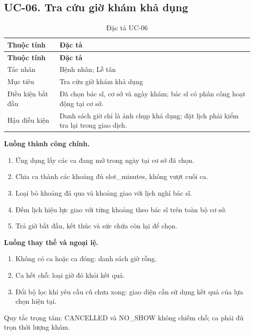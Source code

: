\clearpage

\subsection{UC-06.\allowbreak{} Tra cứu giờ khám khả dụng}
\label{uc:6}

{\small\setlength{\tabcolsep}{3pt}\renewcommand{\arraystretch}{1.12}
\begin{longtable}{@{}L{\textwidth-1.32pt\relax} L{\textwidth-4.68pt\relax}@{}}
\caption{Đặc tả UC-06}\\
\toprule
\textbf{Thuộc tính} & \textbf{Đặc tả}\\\midrule
\endfirsthead
\toprule
\textbf{Thuộc tính} & \textbf{Đặc tả}\\\midrule
\endhead
\bottomrule\endlastfoot
Tác nhân & Bệnh nhân; Lễ tân\\[3pt]
Mục tiêu & Tra cứu giờ khám khả dụng\\[3pt]
Điều kiện bắt đầu & Đã chọn bác sĩ, cơ sở và ngày khám; bác sĩ có phân công hoạt động tại cơ sở.\allowbreak{}\\[3pt]
Hậu điều kiện & Danh sách giờ chỉ là ảnh chụp khả dụng; đặt lịch phải kiểm tra lại trong giao dịch.\allowbreak{}\\[3pt]
\end{longtable}}
\noindent\textbf{Luồng thành công chính.}
\begin{enumerate}
\item Ứng dụng lấy các ca đang mở trong ngày tại cơ sở đã chọn.\allowbreak{}
\item Chia ca thành các khoảng đủ slot\_\allowbreak{}minutes, không vượt cuối ca.\allowbreak{}
\item Loại bỏ khoảng đã qua và khoảng giao với lịch nghỉ bác sĩ.\allowbreak{}
\item Đếm lịch hiệu lực giao với từng khoảng theo bác sĩ trên toàn bộ cơ sở.\allowbreak{}
\item Trả giờ bắt đầu, kết thúc và sức chứa còn lại để chọn.\allowbreak{}
\end{enumerate}
\noindent\textbf{Luồng thay thế và ngoại lệ.}
\begin{enumerate}
\item Không có ca hoặc ca đóng:\allowbreak{} danh sách giờ rỗng.\allowbreak{}
\item Ca hết chỗ:\allowbreak{} loại giờ đó khỏi kết quả.\allowbreak{}
\item Đổi bộ lọc khi yêu cầu cũ chưa xong:\allowbreak{} giao diện cần sử dụng kết quả của lựa chọn hiện tại.\allowbreak{}
\end{enumerate}
Quy tắc trọng tâm:\allowbreak{} CANCELLED và NO\_\allowbreak{}SHOW không chiếm chỗ; ca phải đủ trọn thời lượng khám.\allowbreak{}

